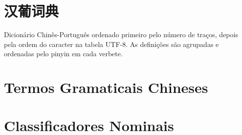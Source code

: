 \documentclass[a4paper,9pt,twoside,openright,book]{memoir}
\begin{document}
\let\clearforchapter\par %



\clearpage
\pagestyle{empty}
\tableofcontents

\clearpage
\pagestyle{empty}
\chapter{汉葡词典}

%
%

Dicionário Chinês-Português ordenado primeiro pelo número de traços,
depois pela ordem do caracter na tabela UTF-8.  As definições são
agrupadas e ordenadas pelo pinyin em cada verbete.

\clearpage
\pagestyle{dictionary}
\twocolumn





















%
%
%
%
%
%
%
%
%
\onecolumn

\clearpage
\pagestyle{plain}
\chapter{Termos Gramaticais Chineses}


\clearpage
\pagestyle{plain}
\chapter{Classificadores Nominais}

\end{document}
